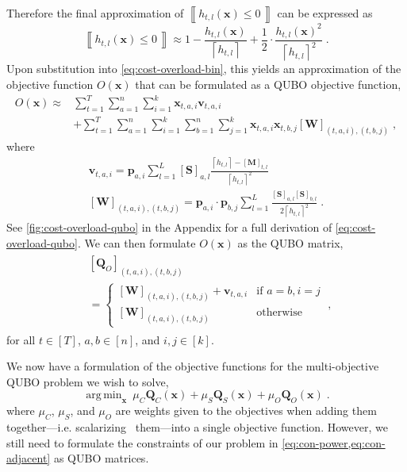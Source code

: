 \documentclass[conference]{IEEEtran}
\makeatletter
\newcommand{\bv}{\boldsymbol{v}}
\newcommand{\bW}{\boldsymbol{W}}
\newcommand{\bp}{\boldsymbol{p}}
\newcommand{\bS}{\boldsymbol{S}}
\newcommand{\bQ}{\boldsymbol{Q}}
\newcommand{\indices}[1]{[#1]}
\newcommand{\iverson}[1]{\left\llbracket #1\, \right\rrbracket}
\newcommand{\bx}{\boldsymbol{x}}
\newcommand{\maxload}{\boldsymbol{M}}
\newcommand{\fnorm}[1]{\left\lceil #1 \right\rceil}
\DeclareMathOperator*{\argmin}{arg\,min}
\newcommand{\QUBO}{\textsc{QUBO}\@\xspace}
\makeatother
\begin{document}
Therefore the final approximation of $\iverson{h_{t,l}(\bx) \leq 0}$ can
be expressed as
\begin{equation}
  \label{eq:3}
  \iverson{h_{t,l}(\bx) \leq 0}
  \approx
  1 - \frac{h_{t,l}(\bx)}{\fnorm{h_{t,l}}}
  + \frac{1}{2}\cdot \frac{h_{t,l}(\bx)^{2}}{\fnorm{h_{t,l}}^{2}}\;.
\end{equation}
Upon substitution into \cref{eq:cost-overload-bin}, this yields an
approximation of the objective function $O(\bx)$ that can be formulated
as a {\QUBO} objective function,
\begin{align}
  O(\bx)
  \approx & \sum_{t=1}^{T}\sum_{a=1}^{n}\sum_{i=1}^{k}
            \bx_{t,a,i} \bv_{t,a,i}\label{eq:cost-overload-qubo}\\
          &+ \sum_{t=1}^{T}\sum_{a=1}^{n}\sum_{i=1}^{k}
            \sum_{b=1}^{n}\sum_{j=1}^{k}
            \bx_{t,a,i}\bx_{t,b,j} [\bW]_{(t,a,i),(t,b,j)}\;,\nonumber
\end{align}
where
\begin{gather}
  \label{eq:4}
  \bv_{t,a,i} = \bp_{a,i} \sum_{l=1}^{L} [\bS]_{a,l}
  \frac{\fnorm{h_{t,l}} -[\maxload]_{t,l}}{\fnorm{h_{t,l}}^{2}}\\
  [\bW]_{(t,a,i),(t,b,j)}
  = \bp_{a,i}\cdot\bp_{b,j}
  \sum_{l=1}^{L}
  \frac{[\bS]_{a,l}[\bS]_{b,l}}{2\fnorm{h_{t,l}}^{2}}\;.
\end{gather}
See \cref{fig:cost-overload-qubo} in the Appendix for a full derivation
of \cref{eq:cost-overload-qubo}. We can then formulate $O(\bx)$ as the
{\QUBO} matrix,
\begin{gather}
  \label{eq:1}
  \begin{aligned}
    &[\bQ_{O}]_{(t,a,i), (t,b,j)}\\
    &=
    \begin{cases}
      [\bW]_{(t,a,i),(t,b,j)} +\bv_{t,a,i} & \text{if } a = b, i=j\\
      [\bW]_{(t,a,i),(t,b,j)} & \text{otherwise}
    \end{cases}\;,
  \end{aligned}
\end{gather}
for all $t\in\indices{T}$, $a,b\in\indices{n}$, and $i,j\in\indices{k}$.

We now have a formulation of the objective functions for the
multi-objective {\QUBO} problem we wish to solve,
\begin{equation}
  \label{eq:init-qubo}
  \argmin_{\bx}\: \mu_{C}\bQ_{C}(\bx)
  + \mu_{S}\bQ_{S}(\bx)
  + \mu_{O}\bQ_{O}(\bx)\;.
\end{equation}
where $\mu_{C}$, $\mu_{S}$, and $\mu_{O}$ are weights given to the
objectives when adding them
together---i.e. scalarizing~\cite{ayodele2023} them---into a single
objective function.  However, we still need to formulate the constraints
of our problem in \cref{eq:con-power,eq:con-adjacent} as {\QUBO}
matrices.
\end{document}

